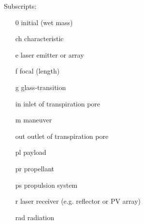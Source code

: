 \documentclass[final,3p,times,twocolumn,sort&compress, lefttitle]{elsarticle}
\begin{document}
            Subscripts:
            \begin{itemize}
                \item[0] initial (wet mass)
                \item[ch] characteristic
                \item[e] laser emitter or array
                \item[f] focal (length) 
                \item[g] glass-transition
                \item[in] inlet of transpiration pore
                \item[m] maneuver
                \item[out] outlet of transpiration pore
                \item[pl] payload
                \item[pr] propellant
                \item[ps] propulsion system
                \item[r]  laser receiver (e.g. reflector or PV array) 
                \item[rad] radiation
            \end{itemize}

 






\end{document}
